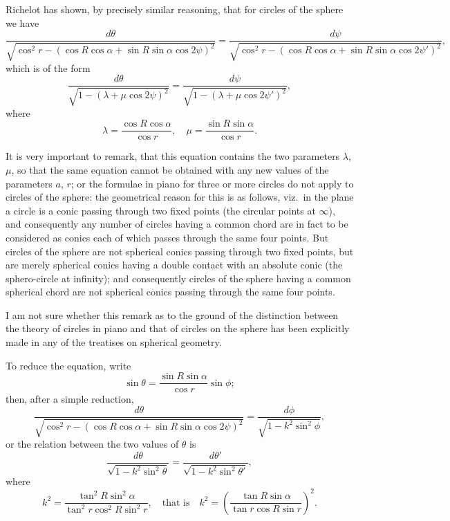 \documentclass[11pt,a4paper]{book}
\begin{document}
{{Richelot has shown, by precisely similar reasoning, that for circles of the sphere we have
\[
\frac{d\theta}{\sqrt{\cos^2 r - (\cos R \cos\alpha + \sin R \sin\alpha \cos 2\psi)^2}} = \frac{d\psi}{\sqrt{\cos^2 r - (\cos R \cos\alpha + \sin R \sin\alpha \cos 2\psi')^2}},
\]
which is of the form
\[
\frac{d\theta}{\sqrt{1-(\lambda + \mu\cos 2\psi)^2}} = \frac{d\psi}{\sqrt{1-(\lambda + \mu\cos 2\psi')^2}},
\]
where
\[
\lambda = \frac{\cos R \cos\alpha}{\cos r}, \quad \mu = \frac{\sin R \sin\alpha}{\cos r}.
\]

It is very important to remark, that this equation contains the two parameters $\lambda$, $\mu$, so that the same equation cannot be obtained with any new values of the parameters $a$, $r$; or the formulae in piano for three or more circles do not apply to circles of the sphere: the geometrical reason for this is as follows, viz.\ in the plane a circle is a conic passing through two fixed points (the circular points at $\infty$), and consequently any number of circles having a common chord are in fact to be considered as conics each of which passes through the same four points. But circles of the sphere are not spherical conics passing through two fixed points, but are merely spherical conics having a double contact with an absolute conic (the sphero-circle at infinity); and consequently circles of the sphere having a common spherical chord are not spherical conics passing through the same four points.

I am not sure whether this remark as to the ground of the distinction between the theory of circles in piano and that of circles on the sphere has been explicitly made in any of the treatises on spherical geometry.

To reduce the equation, write
\[
\sin\theta = \frac{\sin R \sin\alpha}{\cos r} \sin\phi;
\]
then, after a simple reduction,
\[
\frac{d\theta}{\sqrt{\cos^2 r - (\cos R \cos\alpha + \sin R \sin\alpha \cos 2\psi)^2}} = \frac{d\phi}{\sqrt{1 - k^2\sin^2\phi}},
\]
or the relation between the two values of $\theta$ is
\[
\frac{d\theta}{\sqrt{1 - k^2\sin^2\theta}} = \frac{d\theta'}{\sqrt{1 - k^2\sin^2\theta'}},
\]
where
\[
k^2 = \frac{\tan^2 R \sin^2\alpha}{\tan^2 r \cos^2 R \sin^2 r}, \quad \text{that is} \quad k^2 = \left(\frac{\tan R \sin\alpha}{\tan r \cos R \sin r}\right)^2.
\]

}}
\end{document}
